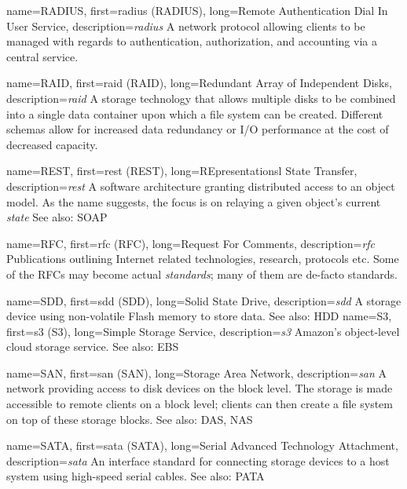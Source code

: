 {
	name={RADIUS},
	first={\acrlong{radius} (RADIUS)},
	long={Remote Authentication Dial In User Service},
	description={{\em \acrlong{radius}} A network
protocol allowing clients to be managed with regards to authentication,
authorization, and accounting via a central service.}
}

{
	name={RAID},
	first={\acrlong{raid} (RAID)},
	long={Redundant Array of Independent Disks},
	description={{\em \acrlong{raid}} A storage
technology that allows multiple disks to be combined into a single data
container upon which a file system can be created.  Different schemas allow
for increased data redundancy or I/O performance at the cost of decreased
capacity.}
}

{
	name={REST},
	first={\acrlong{rest} (REST)},
	long={REpresentationsl State Transfer},
	description={{\em \acrlong{rest}} A software architecture
granting distributed access to an object model.  As the name suggests, the
focus is on relaying a given object's current {\em state} See also: SOAP}
}

{
	name={RFC},
	first={\acrlong{rfc} (RFC)},
	long={Request For Comments},
	description={{\em \acrlong{rfc}} Publications outlining Internet
related technologies, research, protocols etc.  Some of the RFCs may
become actual {\em standards}; many of them are de-facto standards.}
}

{
	name={SDD},
	first={\acrlong{sdd} (SDD)},
	long={Solid State Drive},
	description={{\em \acrlong{sdd}} A
storage device using non-volatile Flash memory to
store data.  See also: HDD}
}
{
	name={S3},
	first={\acrlong{s3} (S3)},
	long={Simple Storage Service},
	description={{\em \acrlong{s3}} Amazon's object-level cloud storage
service.  See also: EBS}
}

{
	name={SAN},
	first={\acrlong{san} (SAN)},
	long={Storage Area Network},
	description={{\em \acrlong{san}} A network providing access to disk
devices on the block level.  The storage is made accessible to remote
clients on a block level; clients can then create a file system on top of
these storage blocks.  See also: DAS, NAS}
}

{
	name={SATA},
	first={\acrlong{sata} (SATA)},
	long={Serial Advanced Technology Attachment},
	description={{\em \acrlong{sata}} An interface
standard for connecting storage devices to a host system using high-speed
serial cables.  See also: PATA}
}

